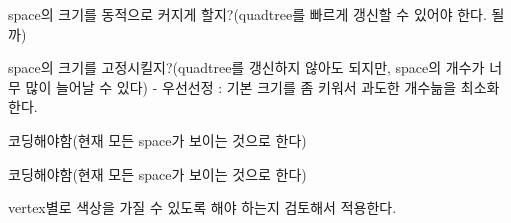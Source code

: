 \begin{DoxyRefList}
\begin{DoxyItemize}
\begin{DoxyItemize}
\item space의 크기를 동적으로 커지게 할지?(quadtree를 빠르게 갱신할 수 있어야 한다. 될까)
\item space의 크기를 고정시킬지?(quadtree를 갱신하지 않아도 되지만, space의 개수가 너무 많이 늘어날 수 있다) -\/ 우선선정 \+: 기본 크기를 좀 키워서 과도한 개수늚을 최소화한다.  
\end{DoxyItemize}
\end{DoxyItemize}
\item[\label{todo__todo000005}%
\hypertarget{todo__todo000005}{}%
Member \hyperlink{class_c_g_space_manager_a589bd71d0ccbd424c0e2e4bd4e591d20}{C\+G\+Space\+Manager\+:\+:Find\+Space\+In\+View} (G\+O\+U\+T C\+Atl\+Array$<$ C\+G\+Space $\ast$ $>$ \&arr\+Space)]
\begin{DoxyItemize}
\item 코딩해야함(현재 모든 space가 보이는 것으로 한다)  
\end{DoxyItemize}
\item[\label{todo__todo000006}%
\hypertarget{todo__todo000006}{}%
Member \hyperlink{class_c_g_space_manager_a5a5ec91ddf3252a0e965a46105100422}{C\+G\+Space\+Manager\+:\+:Find\+Space\+Out\+Of\+View} (G\+O\+U\+T C\+Atl\+Array$<$ C\+G\+Space $\ast$ $>$ \&arr\+Space)]
\begin{DoxyItemize}
\item 코딩해야함(현재 모든 space가 보이는 것으로 한다)  
\end{DoxyItemize}
\item[\label{todo__todo000010}%
\hypertarget{todo__todo000010}{}%
Class \hyperlink{struct_g_v_e_r_t_e_x}{G\+V\+E\+R\+T\+E\+X} ]
\begin{DoxyItemize}
\item vertex별로 색상을 가질 수 있도록 해야 하는지 검토해서 적용한다. 
\end{DoxyItemize}
\end{DoxyRefList}